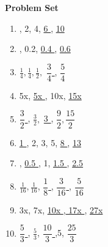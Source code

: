 \textbf{Problem Set}

\vspce


\begin{enumerate}[label = \arabic*. ]

\item {}, 2, 4, \underline{ 6 }, \underline{ 10 } 
\vspce
\item {}, 0.2, \underline{ 0.4 } , \underline{ 0.6 } 
\vspce
\item \hspce  $\displaystyle \frac{1}{4}, \frac{1}{4}, \frac{1}{2}, $ \underline{ $\dfrac{3}{4}$ }, \underline{ $\dfrac{5}{4} $ }
\vspce
\item \hspce  5x, \underline{ 5x } , 10x, \underline{ 15x } 
\vspce
\item \hspce  \underline{ $\dfrac{3}{2}$ },   $\displaystyle \frac{3}{2},$ \underline{ 3 } , $\dfrac{9}{2}, \dfrac{15}{2}$ 

\item \hspce  \underline{ 1 }, 2, 3, 5, \underline{ 8 } , \underline{ 13 } 
\vspce
\item {}, \underline{ 0.5 } , 1, \underline{ 1.5 } , \underline{ 2.5 } 
\vspce
\item \hspce  $\displaystyle \frac{1}{16}, \frac{1}{16}$,   \underline{ $\dfrac{1}{8}$ }, \underline{ $\dfrac{3}{16}$ } , \underline{ $\dfrac{5}{16}$ } 
\vspce
\item \hspce  3x, 7x, \underline{ 10x } ,\underline{ 17x } ,  \underline{ 27x }  
\vspce
\item \hspce  \underline{ $\dfrac{5}{3}$ } ,   $\displaystyle \frac{5}{3}$, \underline{ $\dfrac{10}{3}$ } ,5, \underline{ $\dfrac{25}{3}$ } 


\end{enumerate}


 



